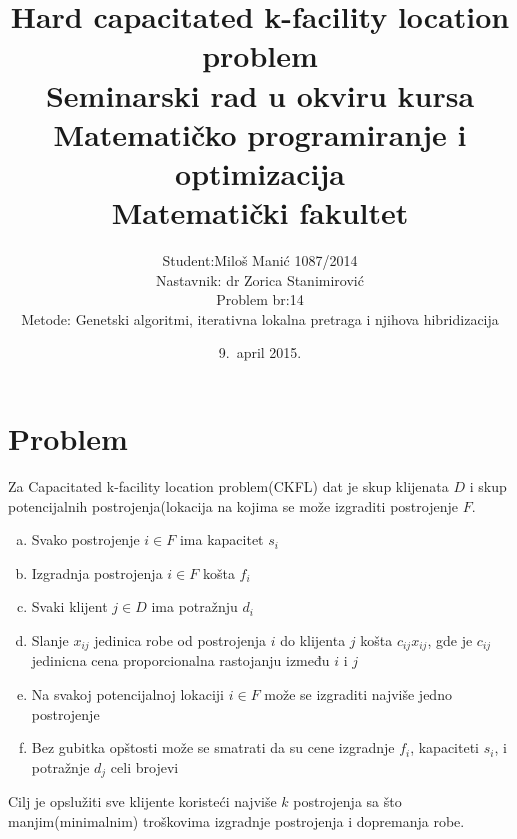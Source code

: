\documentclass[a4paper]{article}
\begin{document}
\title{Hard capacitated k-facility location problem \\ \small{Seminarski rad u okviru kursa\\
Matematičko programiranje i optimizacija\\ Matematički fakultet}}

\author{
Student:Miloš Manić 1087/2014\\
Nastavnik: dr Zorica Stanimirović\\
Problem br:14\\
Metode: Genetski algoritmi, iterativna lokalna pretraga i njihova hibridizacija}
\date{9.~april 2015.}
\maketitle

\tableofcontents

\newpage

\section{Problem}


Za Capacitated k-facility location problem(CKFL) dat je skup klijenata $D$ i skup potencijalnih postrojenja(lokacija na kojima se može izgraditi postrojenje $F$\cite{original}.
\begin{enumerate}[a)]
\item Svako postrojenje $i \in F$ ima kapacitet $s_i$
\item Izgradnja postrojenja $i \in F$ košta $f_i$
\item Svaki klijent $j \in D$ ima potražnju $d_i$
\item Slanje $x_{ij}$ jedinica robe od postrojenja $i$ do klijenta $j$ košta $c_{ij}x_{ij}$, gde je $c_{ij}$ jedinicna cena proporcionalna rastojanju između $i$ i $j$
\item Na svakoj potencijalnoj lokaciji $i \in F$ može se izgraditi najviše jedno postrojenje
\item Bez gubitka opštosti može se smatrati da su cene izgradnje $f_i$, kapaciteti $s_i$, i potražnje $d_j$ celi brojevi

\end{enumerate}
Cilj je opslužiti sve klijente koristeći najviše $k$ postrojenja sa što manjim(minimalnim) troškovima izgradnje postrojenja i dopremanja robe.
\end{document}
